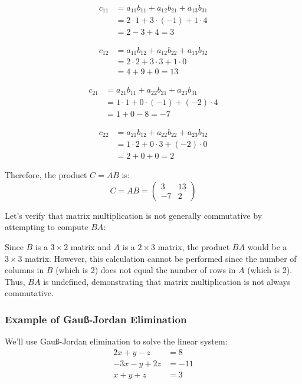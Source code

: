 \begin{align*}
c_{11} &= a_{11}b_{11} + a_{12}b_{21} + a_{13}b_{31} \\
&= 2 \cdot 1 + 3 \cdot (-1) + 1 \cdot 4 \\
&= 2 - 3 + 4 = 3
\end{align*}

\begin{align*}
c_{12} &= a_{11}b_{12} + a_{12}b_{22} + a_{13}b_{32} \\
&= 2 \cdot 2 + 3 \cdot 3 + 1 \cdot 0 \\
&= 4 + 9 + 0 = 13
\end{align*}

\begin{align*}
c_{21} &= a_{21}b_{11} + a_{22}b_{21} + a_{23}b_{31} \\
&= 1 \cdot 1 + 0 \cdot (-1) + (-2) \cdot 4 \\
&= 1 + 0 - 8 = -7
\end{align*}

\begin{align*}
c_{22} &= a_{21}b_{12} + a_{22}b_{22} + a_{23}b_{32} \\
&= 1 \cdot 2 + 0 \cdot 3 + (-2) \cdot 0 \\
&= 2 + 0 + 0 = 2
\end{align*}

Therefore, the product \(C = AB\) is:
\begin{equation*}
C = AB = 
\begin{pmatrix}
3 & 13 \\
-7 & 2
\end{pmatrix}
\end{equation*}

Let's verify that matrix multiplication is not generally commutative by attempting to compute \(BA\):

Since \(B\) is a \(3 \times 2\) matrix and \(A\) is a \(2 \times 3\) matrix, the product \(BA\) would be a \(3 \times 3\) matrix. However, this calculation cannot be performed since the number of columns in \(B\) (which is 2) does not equal the number of rows in \(A\) (which is 2). Thus, \(BA\) is undefined, demonstrating that matrix multiplication is not always commutative.

\subsubsection{Example of Gauß-Jordan Elimination}

We'll use Gauß-Jordan elimination to solve the linear system:
\begin{align*}
2x + y - z &= 8 \\
-3x - y + 2z &= -11 \\
x + y + z &= 3
\end{align*}

